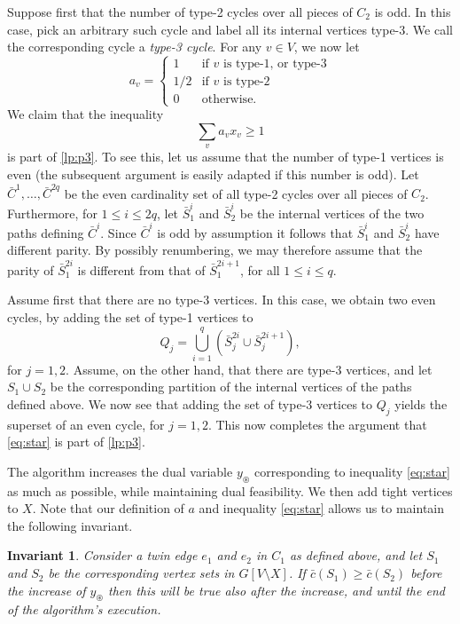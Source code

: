 \documentclass{article}
\newcommand{\0}{\mathbb{0}}
\newcommand{\1}{\mathbb{1}}
\newtheorem{inva}[theorem]{Invariant}
\begin{document}
Suppose first that the number of type-2 cycles over all pieces of $C_2$ is
odd. In this case, pick an arbitrary such cycle and label all its internal
vertices type-3. We call the corresponding cycle a {\em type-3 cycle}. For any
$v \in V$, we now let
\[
  a_v = \begin{cases} 
    1 & \mbox{if $v$ is type-1, or type-3}\\
    1/2 & \mbox{if $v$ is type-2}\\
    0 & \mbox{otherwise.}  
    \end{cases}
\]
We claim that the inequality
\begin{equation}\tag{$\circledast$}\label{eq:star} 
  \sum_v a_v x_v \geq 1 
\end{equation}
is part of \eqref{lp:p3}. To see this, let us assume that the number of type-1
vertices is even (the subsequent argument is easily adapted if this number is
odd). Let $\bar{C}^1, \ldots, \bar{C}^{2q}$ be the even cardinality set of all
type-2 cycles over all pieces of $C_2$. Furthermore, for $1 \leq i \leq 2q$,
let $ \bar{S}^i_1$ and $\bar{S}^i_2$ be the internal vertices of the two paths
defining $\bar{C}^i$. Since $\bar{C}^i$ is odd by assumption it follows that
$\bar{S}^i_1$ and $\bar{S}^i_2$ have different parity. By possibly
renumbering, we may therefore assume that the parity of $\bar{S}^{2i}_1$ is
different from that of $\bar{S}^{2i+1}_1$, for all $1 \leq i \leq q$. 

Assume first that there are no type-3 vertices. In this case, we obtain two
even cycles, by adding the set of type-1 vertices to  
\[ Q_j =
\bigcup_{i=1}^q(\bar{S}^{2i}_j \cup \bar{S}^{2i+1}_j), \]  
for $j=1,2$. 
Assume, on the other hand, that there are type-3 vertices, and let $S_1 \cup S_2$ be the
corresponding partition of the internal vertices of the paths defined above. 
We now see that adding the set of type-3 vertices to $Q_j$ yields the superset
of an even cycle, for $j=1,2$. This now completes the argument that \eqref{eq:star} is
part of \ref{lp:p3}. 

The algorithm increases the dual variable $y_{\circledast}$ corresponding to
inequality \eqref{eq:star} as much as possible, while maintaining dual feasibility. 
We then add tight vertices to $X$. Note that our definition of $a$ and inequality 
\eqref{eq:star} allows us to maintain the following invariant.

\begin{inva}\label{inva}
  Consider a twin edge $e_1$ and $e_2$ in $C_1$ as defined above, and let $S_1$ and $S_2$
  be the corresponding vertex sets in $G[V\setminus X]$. If $\bar{c}(S_1) \geq \bar{c}
  (S_2)$ before the increase of $y_{\circledast}$ then this will be true also after the
  increase, and until the end of the algorithm's execution. 
\end{inva}
\end{document}
